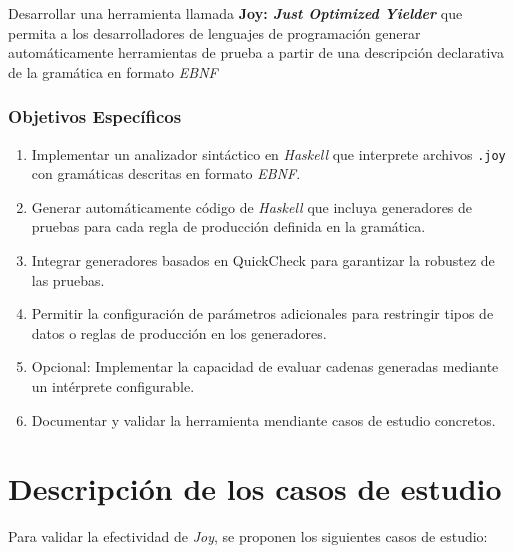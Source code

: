 \documentclass[12pt]{article}
\begin{document}
Desarrollar una herramienta llamada \textbf{Joy: \textit{Just Optimized Yielder}} que permita a los desarrolladores de lenguajes de programación generar automáticamente herramientas de prueba a partir de una descripción declarativa de la gramática en formato \textit{EBNF}

\subsubsection*{Objetivos Específicos}

\begin{enumerate}
\item Implementar un analizador sintáctico en \textit{Haskell} que interprete archivos \texttt{.joy} con gramáticas descritas en formato \textit{EBNF}.
\item Generar automáticamente código de \textit{Haskell} que incluya generadores de pruebas para cada regla de producción definida en la gramática.
\item Integrar generadores basados en QuickCheck para garantizar la robustez de las pruebas.
\item Permitir la configuración de parámetros adicionales para restringir tipos de datos o reglas de producción en los generadores.
\item Opcional: Implementar la capacidad de evaluar cadenas generadas mediante un intérprete configurable.
\item Documentar y validar la herramienta mendiante casos de estudio concretos.
\end{enumerate}

\section*{Descripción de los casos de estudio}

Para validar la efectividad de \textit{Joy}, se proponen los siguientes casos de estudio:
\end{document}
